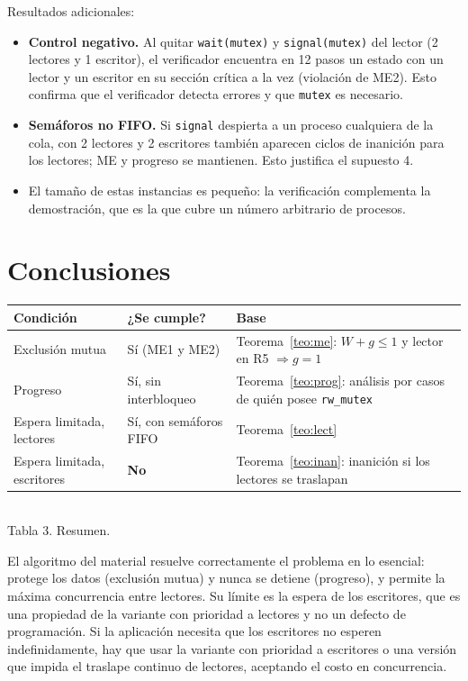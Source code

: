 \documentclass[12pt,letterpaper]{article}
\theoremstyle{definition}
\newcommand{\sem}[1]{\texttt{#1}}
\begin{document}
Resultados adicionales:
\begin{itemize}[itemsep=2pt]
\item \textbf{Control negativo.} Al quitar \sem{wait(mutex)} y \sem{signal(mutex)} del lector (2 lectores y 1 escritor), el verificador encuentra en 12 pasos un estado con un lector y un escritor en su sección crítica a la vez (violación de ME2). Esto confirma que el verificador detecta errores y que \sem{mutex} es necesario.
\item \textbf{Semáforos no FIFO.} Si \sem{signal} despierta a un proceso cualquiera de la cola, con 2 lectores y 2 escritores también aparecen ciclos de inanición para los lectores; ME y progreso se mantienen. Esto justifica el supuesto 4.
\item El tamaño de estas instancias es pequeño: la verificación complementa la demostración, que es la que cubre un número arbitrario de procesos.
\end{itemize}

\section{Conclusiones}
\begin{center}
\small
\renewcommand{\arraystretch}{1.2}
\begin{tabular}{|>{\raggedright\arraybackslash}p{3.3cm}|>{\raggedright\arraybackslash}p{2.6cm}|>{\raggedright\arraybackslash}p{7.6cm}|}
\hline
\textbf{Condición} & \textbf{¿Se cumple?} & \textbf{Base}\\
\hline
Exclusión mutua & Sí (ME1 y ME2) & Teorema~\ref{teo:me}: $W+g\le1$ y lector en R5 $\Rightarrow g=1$\\ \hline
Progreso & Sí, sin interbloqueo & Teorema~\ref{teo:prog}: análisis por casos de quién posee \sem{rw\_mutex}\\ \hline
Espera limitada, lectores & Sí, con semáforos FIFO & Teorema~\ref{teo:lect}\\ \hline
Espera limitada, escritores & \textbf{No} & Teorema~\ref{teo:inan}: inanición si los lectores se traslapan\\ \hline
\end{tabular}\\[3pt]
{\footnotesize Tabla 3. Resumen.}
\end{center}
El algoritmo del material resuelve correctamente el problema en lo esencial: protege los datos (exclusión mutua) y nunca se detiene (progreso), y permite la máxima concurrencia entre lectores. Su límite es la espera de los escritores, que es una propiedad de la variante con prioridad a lectores y no un defecto de programación. Si la aplicación necesita que los escritores no esperen indefinidamente, hay que usar la variante con prioridad a escritores o una versión que impida el traslape continuo de lectores, aceptando el costo en concurrencia.
\end{document}

